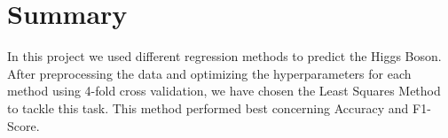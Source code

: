 \documentclass[10pt,conference,compsocconf]{IEEEtran}
\begin{document}
\section{Summary}

In this project we used different regression methods to predict the Higgs Boson. After preprocessing the data and optimizing the hyperparameters for each method using 4-fold cross validation, we have chosen the Least Squares Method to tackle this task. This method performed best concerning Accuracy and F1-Score.



%
%
\end{document}
